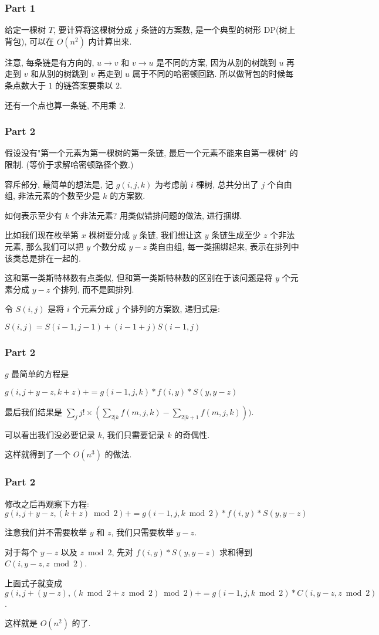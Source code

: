 \documentclass{beamer}
\begin{document}
\begin{frame}
\frametitle{Part 1}

给定一棵树 $T$, 要计算将这棵树分成 $j$ 条链的方案数, 是一个典型的树形 DP(树上背包), 可以在 $O(n^2)$ 内计算出来. 

注意, 每条链是有方向的, $u \to v$ 和 $v \to u$ 是不同的方案, 因为从别的树跳到 $u$ 再走到 $v$ 和从别的树跳到 $v$ 再走到 $u$ 属于不同的哈密顿回路. 
所以做背包的时候每条点数大于 $1$ 的链答案要乘以 $2$. 

还有一个点也算一条链, 不用乘 $2$. 
\end{frame}

\begin{frame}
\frametitle{Part 2}
假设没有"第一个元素为第一棵树的第一条链, 最后一个元素不能来自第一棵树" 的限制. (等价于求解哈密顿路径个数.)

容斥部分, 最简单的想法是, 记 $g(i, j, k)$ 为考虑前 $i$ 棵树, 总共分出了 $j$ 个自由组, 非法元素的个数至少是 $k$ 的方案数. 

如何表示至少有 $k$ 个非法元素? 用类似错排问题的做法, 进行捆绑. 

比如我们现在枚举第 $x$ 棵树要分成 $y$ 条链, 我们想让这 $y$ 条链生成至少 $z$ 个非法元素, 那么我们可以把 $y$ 个数分成 $y-z$ 类自由组, 
每一类捆绑起来, 表示在排列中该类总是排在一起的. 

这和第一类斯特林数有点类似, 但和第一类斯特林数的区别在于该问题是将 $y$ 个元素分成 $y - z$ 个排列, 而不是圆排列. 

令 $S(i, j)$ 是将 $i$ 个元素分成 $j$ 个排列的方案数, 递归式是:

$S(i, j) = S(i - 1, j - 1)+(i - 1 + j)S(i - 1, j)$
\end{frame}

\begin{frame}
\frametitle{Part 2}

$g$ 最简单的方程是

$g(i, j + y - z, k + z) += g(i - 1, j, k) * f(i, y) * S(y, y - z)$

最后我们结果是 $\sum_{j} j! \times (\sum_{2 | k}f(m, j, k) - \sum_{2 | k + 1}f(m, j, k)))$.

可以看出我们没必要记录 $k$, 我们只需要记录 $k$ 的奇偶性.  

这样就得到了一个 $O(n^3)$ 的做法. 
\end{frame}

\begin{frame}
\frametitle{Part 2}


修改之后再观察下方程:
$g(i, j + y - z, (k + z)\bmod 2) += g(i - 1, j, k\bmod 2) * f(i, y) * S(y, y - z)$

注意我们并不需要枚举 $y$ 和 $z$, 我们只需要枚举 $y - z$. 

对于每个 $y - z$ 以及 $z\bmod 2$, 先对 $f(i, y) * S(y, y - z)$ 求和得到 $C(i, y - z, z\bmod 2)$. 

上面式子就变成
$g(i, j + (y - z), (k\bmod 2 + z\bmod 2)\bmod 2) += g(i - 1, j, k\bmod 2) * C(i, y - z, z\bmod 2)$. 

这样就是 $O(n^2)$ 的了. 
\end{frame}
\end{document}
